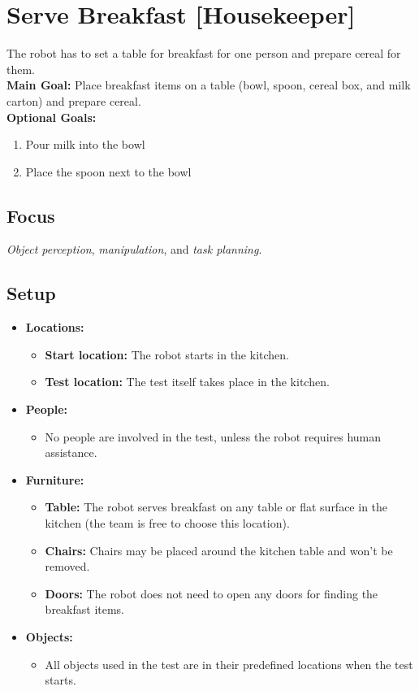 \section{Serve Breakfast [Housekeeper]}
\label{test:serve-breakfast}
The robot has to set a table for breakfast for one person and prepare cereal for them.\\

\noindent \textbf{Main Goal:} Place breakfast items on a table (bowl, spoon, cereal box, and milk carton) and prepare cereal.\\

\noindent \textbf{Optional Goals:}
\begin{enumerate}[nosep]
	\item Pour milk into the bowl
	\item Place the spoon next to the bowl
\end{enumerate}

\subsection*{Focus}
\emph{Object perception}, \emph{manipulation}, and \emph{task planning}.

\subsection*{Setup}
\begin{itemize}[nosep]
	\item \textbf{Locations:}
		\begin{itemize}
			\item \textbf{Start location:} The robot starts in the kitchen.
			\item \textbf{Test location:} The test itself takes place in the kitchen.
		\end{itemize}
		\item \textbf{People:}
			\begin{itemize}
				\item No people are involved in the test, unless the robot requires human assistance.
			\end{itemize}
	\item \textbf{Furniture:}
		\begin{itemize}
			\item \textbf{Table:} The robot serves breakfast on any table or flat surface in the kitchen (the team is free to choose this location).
			\item \textbf{Chairs:} Chairs may be placed around the kitchen table and won't be removed.
			\item \textbf{Doors:} The robot does not need to open any doors for finding the breakfast items.
		\end{itemize}
	\item \textbf{Objects:}
		\begin{itemize}
			\item All objects used in the test are in their predefined locations when the test starts.
		\end{itemize}
\end{itemize}


